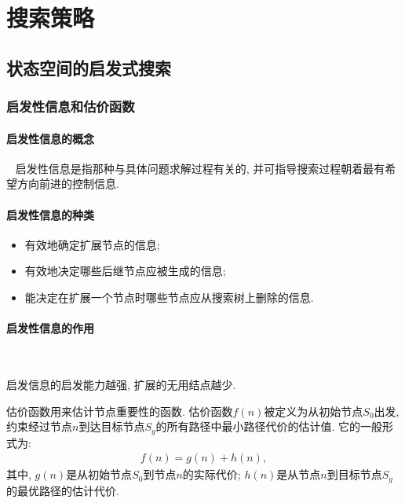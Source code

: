 \section{搜索策略}
\subsection{状态空间的启发式搜索}
\subsubsection{启发性信息和估价函数}
\paragraph{启发性信息的概念}~{}
启发性信息是指那种与具体问题求解过程有关的, 并可指导搜索过程朝着最有希望方向前进的控制信息.

\paragraph{启发性信息的种类}
\begin{itemize}
\item 有效地确定扩展节点的信息;
\item 有效地决定哪些后继节点应被生成的信息;
\item 能决定在扩展一个节点时哪些节点应从搜索树上删除的信息.
\end{itemize}
\paragraph{启发性信息的作用}~{}

启发信息的启发能力越强, 扩展的无用结点越少.

估价函数用来估计节点重要性的函数. 估价函数$f(n)$被定义为从初始节点$S_0$出发, 约束经过节点$n$到达目标节点$S_g$的所有路径中最小路径代价的估计值. 它的一般形式为:
\begin{align}
  f(n)=g(n)+h(n),
\end{align}
其中, $g(n)$是从初始节点$S_0$到节点$n$的实际代价; $h(n)$是从节点$n$到目标节点$S_g$的最优路径的估计代价.
